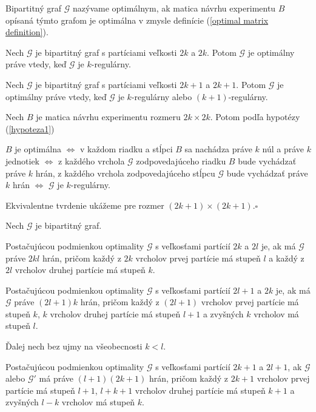 \begin{defin}
Bipartitný graf $\mathcal{G}$ nazývame optimálnym, ak matica návrhu experimentu $B$ opísaná týmto grafom je optimálna v zmysle definície (\ref{optimal matrix definition}).
\end{defin}

\begin{hypoteza}
Nech $\mathcal{G}$ je bipartitný graf s partíciami veľkosti $2k$ a $2k$.
Potom $\mathcal{G}$ je optimálny práve vtedy, keď $\mathcal{G}$ je $k$-regulárny.

Nech $\mathcal{G}$ je bipartitný graf s partíciami veľkosti $2k + 1$ a $2k + 1$.
Potom $\mathcal{G}$ je optimálny práve vtedy, keď $\mathcal{G}$ je $k$-regulárny alebo $(k + 1)$-regulárny.
\end{hypoteza}

\begin{dokaz}
Nech $B$ je matica návrhu experimentu rozmeru $2k \times 2k$. Potom podľa hypotézy (\ref{hypoteza1})

\begin{center}
$B$ je optimálna $\Leftrightarrow$ v každom riadku a stĺpci $B$ sa nachádza práve $k$ núl a práve $k$ jednotiek $\Leftrightarrow$
z každého vrchola $\mathcal{G}$ zodpovedajúceho riadku $B$ bude vychádzať práve $k$ hrán,
z každého vrchola zodpovedajúceho stĺpcu $\mathcal{G}$ bude vychádzať práve $k$ hrán $\Leftrightarrow$ $\mathcal{G}$ je $k$-regulárny.
\end{center}

Ekvivalentne tvrdenie ukážeme pre rozmer $(2k + 1) \times (2k + 1)$.$\square$
\end{dokaz}

\begin{hypoteza}
Nech $\mathcal{G}$ je bipartitný graf.

Postačujúcou podmienkou optimality $\mathcal{G}$ s veľkosťami partícií $2k$ a $2l$ je, ak má $\mathcal{G}$ práve $2kl$ hrán,
pričom každý z $2k$ vrcholov prvej partície má stupeň $l$ a každý z $2l$ vrcholov druhej partície má stupeň $k$.

Postačujúcou podmienkou optimality $\mathcal{G}$ s veľkosťami partícií $2l + 1$ a $2k$ je, ak má $\mathcal{G}$ práve $(2l + 1)k$ hrán,
pričom každý z $(2l + 1)$ vrcholov prvej partície má stupeň $k$, $k$ vrcholov druhej partície má stupeň $l + 1$ a zvyšných $k$ vrcholov má stupeň $l$.

Ďalej nech bez ujmy na všeobecnosti $k < l$.

Postačujúcou podmienkou optimality $\mathcal{G}$ s veľkosťami partícií $2k + 1$ a $2l + 1$, ak $\mathcal{G}$ alebo $\mathcal{G}'$ má práve $(l + 1)(2k + 1)$ hrán,
pričom každý z $2k + 1$ vrcholov prvej partície má stupeň $l + 1$, $l + k + 1$ vrcholov druhej partície má stupeň $k + 1$ a zvyšných $l - k$ vrcholov má stupeň $k$.
\end{hypoteza}

